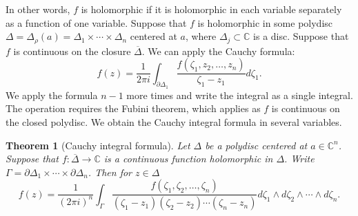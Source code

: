 \documentclass[12pt,openany]{book}
\newcommand{\C}{{\mathbb{C}}}
\theoremstyle{plain}
\newtheorem{thm}{Theorem}[section]
\theoremstyle{remark}
\theoremstyle{definition}
\theoremstyle{exercise}
\theoremstyle{example}
\begin{document}
In other words, $f$ is holomorphic if it is holomorphic in each variable
separately as a function of one variable.  Suppose that $f$ is holomorphic
in some polydisc $\Delta = \Delta_{\rho}(a) = \Delta_1 \times \cdots \times \Delta_n$
centered at $a$, where $\Delta_j \subset \C$ is a disc.
Suppose that $f$ is continuous
on the closure $\overline{\Delta}$.
We can apply the Cauchy formula:
\begin{equation}
f(z) =
\frac{1}{2\pi i}
\int_{\partial \Delta_1}
\frac{f(\zeta_1,z_2,\ldots,z_n)}{\zeta_1-z_1}
d \zeta_1 .
\end{equation}
We apply the formula $n-1$ more times and write the integral
as a single integral.  The operation requires the Fubini theorem, which applies
as $f$ is continuous on the closed polydisc.  We obtain the
Cauchy integral formula in several variables.

\begin{thm}[Cauchy integral formula]
Let $\Delta$ be a polydisc centered at $a \in \C^n$.  Suppose
that $f \colon \overline{\Delta} \to \C$ is a continuous function
holomorphic in $\Delta$.
Write $\Gamma = \partial \Delta_1 \times \cdots \times \partial \Delta_n$.
Then for $z \in \Delta$
\begin{equation}
f(z) =
\frac{1}{{(2\pi i)}^n}
\int_{\Gamma}
\frac{f(\zeta_1,\zeta_2,\ldots,\zeta_n)}{(\zeta_1-z_1)(\zeta_2-z_2)\cdots(\zeta_n-z_n)}
d \zeta_1 
\wedge
d \zeta_2
\wedge
\cdots
\wedge
d \zeta_n .
\end{equation}
\end{thm}
\end{document}
